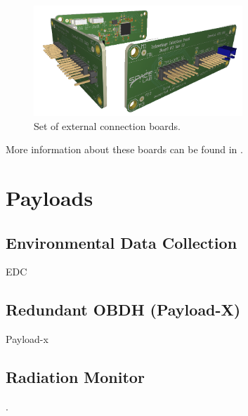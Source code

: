 \begin{figure}[!ht]
    \begin{center}
        \includegraphics[width=0.7\textwidth]{figures/iip_fullset}
        \caption{Set of external connection boards.}
        \label{fig:iip-boards}
    \end{center}
\end{figure}

More information about these boards can be found in \cite{iip}.

\section{Payloads}

\subsection{Environmental Data Collection}

EDC \cite{edc}

\subsection{Redundant OBDH (Payload-X)}

Payload-x \cite{payload-x}

\subsection{Radiation Monitor}

.

